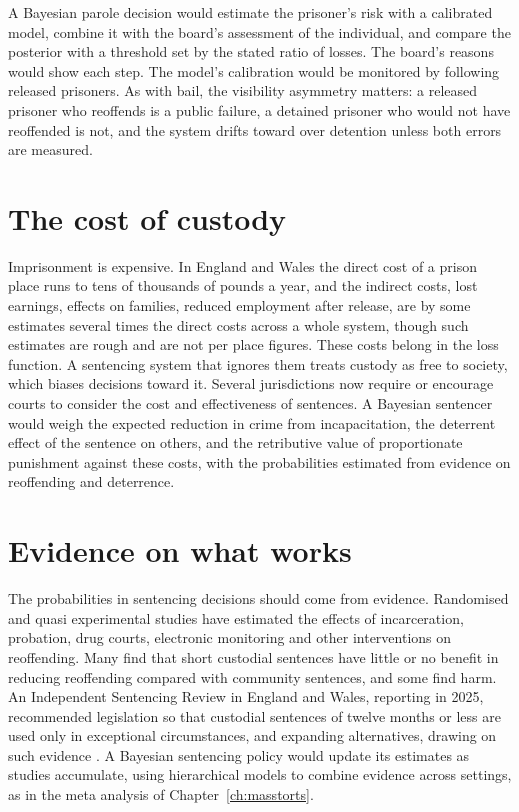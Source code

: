 A Bayesian parole decision would estimate the prisoner's risk with a calibrated model, combine it with the board's assessment of the individual, and compare the posterior with a threshold set by the stated ratio of losses. The board's reasons would show each step. The model's calibration would be monitored by following released prisoners. As with bail, the visibility asymmetry matters: a released prisoner who reoffends is a public failure, a detained prisoner who would not have reoffended is not, and the system drifts toward over detention unless both errors are measured.

\section{The cost of custody}

Imprisonment is expensive. In England and Wales the direct cost of a prison place runs to tens of thousands of pounds a year, and the indirect costs, lost earnings, effects on families, reduced employment after release, are by some estimates several times the direct costs across a whole system, though such estimates are rough and are not per place figures. These costs belong in the loss function. A sentencing system that ignores them treats custody as free to society, which biases decisions toward it. Several jurisdictions now require or encourage courts to consider the cost and effectiveness of sentences. A Bayesian sentencer would weigh the expected reduction in crime from incapacitation, the deterrent effect of the sentence on others, and the retributive value of proportionate punishment against these costs, with the probabilities estimated from evidence on reoffending and deterrence.

\section{Evidence on what works}

The probabilities in sentencing decisions should come from evidence. Randomised and quasi experimental studies have estimated the effects of incarceration, probation, drug courts, electronic monitoring and other interventions on reoffending. Many find that short custodial sentences have little or no benefit in reducing reoffending compared with community sentences, and some find harm. An Independent Sentencing Review in England and Wales, reporting in 2025, recommended legislation so that custodial sentences of twelve months or less are used only in exceptional circumstances, and expanding alternatives, drawing on such evidence \citep{gauke2025}. A Bayesian sentencing policy would update its estimates as studies accumulate, using hierarchical models to combine evidence across settings, as in the meta analysis of Chapter~\ref{ch:masstorts}.

